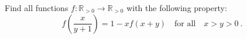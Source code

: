 Find all functions $f\colon\mathbb{R}_{>0} \to \mathbb{R}_{>0}$ with the following property:
$$f\left(\frac{x}{y+1}\right)=1-xf(x+y) \quad \text{for all}\quad x>y>0\ .$$